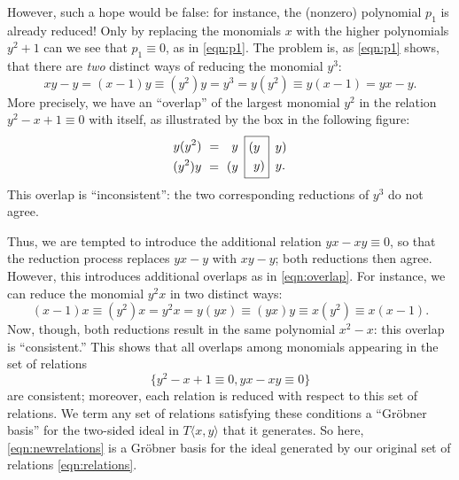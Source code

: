 However, such a hope would be false: for instance, the (nonzero) polynomial $p_1$ is already reduced! Only by replacing the monomials $x$ with the higher polynomials $y^2+1$ can we see that $p_1\equiv 0$, as in \eqref{eqn:p1}. The problem is, as \eqref{eqn:p1} shows, that there are \emph{two} distinct ways of reducing the monomial $y^3$:
\begin{equation*}
xy-y=(x-1)y\equiv (y^2)y=y^3=y(y^2)\equiv y(x-1)=yx-y.
\end{equation*}
More precisely, we have an ``overlap'' of the largest monomial $y^2$ in the relation $y^2-x+1\equiv 0$ with itself, as illustrated by the box in the following figure:
\begin{equation}
\label{eqn:overlap}
\begin{aligned}
y(y^2)\hspace{.35em}=\quad&y\\
(y^2)y\hspace{.35em}=\hspace{.35em}(&y
\end{aligned}
\hspace{.5em}
\boxed{\begin{aligned}
(&y\\
&y)
\end{aligned}}
\hspace{.5em}
\begin{aligned}
&y)\\
&y.
\end{aligned}
\end{equation}
This overlap is ``inconsistent'': the two corresponding reductions of $y^3$ do not agree.

Thus, we are tempted to introduce the additional relation $yx-xy\equiv 0$, so that the reduction process replaces $yx-y$ with $xy-y$; both reductions then agree. However, this introduces additional overlaps as in \eqref{eqn:overlap}. For instance, we can reduce the monomial $y^2x$ in two distinct ways:
\begin{equation*}
(x-1)x\equiv(y^2)x=y^2x=y(yx)\equiv(yx)y\equiv x(y^2)\equiv x(x-1).
\end{equation*}
Now, though, both reductions result in the same polynomial $x^2-x$: this overlap is ``consistent.'' This shows that all overlaps among monomials appearing in the set of relations
\begin{equation}
\label{eqn:newrelations}
\{y^2-x+1\equiv 0, yx-xy\equiv 0\}
\end{equation}
are consistent; moreover, each relation is reduced with respect to this set of relations. We term any set of relations satisfying these conditions a ``Gr\"obner basis'' for the two-sided ideal in $T\langle x,y\rangle$ that it generates. So here, \eqref{eqn:newrelations} is a Gr\"obner basis for the ideal generated by our original set of relations \eqref{eqn:relations}.


